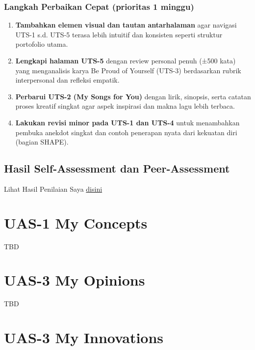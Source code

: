 \documentclass[
  letterpaper,
  DIV=11,
  numbers=noendperiod]{scrreprt}
\providecommand{\tightlist}{%
  \setlength{\itemsep}{0pt}\setlength{\parskip}{0pt}}
\begin{document}
\subsection{Langkah Perbaikan Cepat (prioritas 1
minggu)}\label{langkah-perbaikan-cepat-prioritas-1-minggu}

\begin{enumerate}
\def\labelenumi{\arabic{enumi}.}
\tightlist
\item
  \textbf{Tambahkan elemen visual dan tautan antarhalaman} agar navigasi
  UTS-1 s.d. UTS-5 terasa lebih intuitif dan konsisten seperti struktur
  portofolio utama.
\item
  \textbf{Lengkapi halaman UTS-5} dengan review personal penuh (±500
  kata) yang menganalisis karya Be Proud of Yourself (UTS-3) berdasarkan
  rubrik interpersonal dan refleksi empatik.
\item
  \textbf{Perbarui UTS-2 (My Songs for You)} dengan lirik, sinopsis,
  serta catatan proses kreatif singkat agar aspek inspirasi dan makna
  lagu lebih terbaca.
\item
  \textbf{Lakukan revisi minor pada UTS-1 dan UTS-4} untuk menambahkan
  pembuka anekdot singkat dan contoh penerapan nyata dari kekuatan diri
  (bagian SHAPE).
\end{enumerate}

\section{Hasil Self-Assessment dan
Peer-Assessment}\label{hasil-self-assessment-dan-peer-assessment}

Lihat Hasil Penilaian Saya \href{UTS-5_Skor.xlsx}{disini}


\chapter{UAS-1 My Concepts}\label{uas-1-my-concepts}

TBD


\chapter{UAS-3 My Opinions}\label{uas-3-my-opinions}

TBD


\chapter{UAS-3 My Innovations}\label{uas-3-my-innovations}
\end{document}

